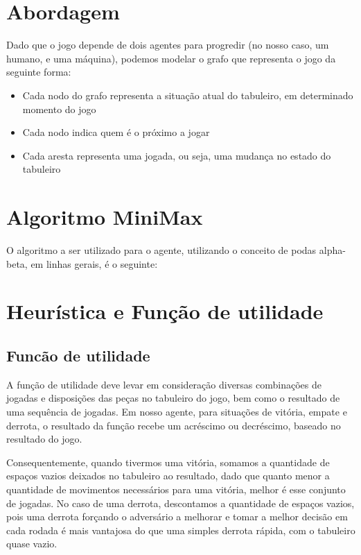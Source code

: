 \documentclass{article}
\begin{document}
  
  
  \section{Abordagem}
  Dado que o jogo depende de dois agentes para progredir (no nosso caso, um humano, e uma máquina), podemos modelar o
  grafo que representa o jogo da seguinte forma:
  
  \begin{itemize}
    \item Cada nodo do grafo representa a situação atual do tabuleiro, em determinado momento do jogo
    \item Cada nodo indica quem é o próximo a jogar
    \item Cada aresta representa uma jogada, ou seja, uma mudança no estado do tabuleiro
  \end{itemize}
  
  \section{Algoritmo MiniMax}
  O algoritmo a ser utilizado para o agente, utilizando o conceito de podas alpha-beta, em linhas gerais, é o seguinte:
  
  
  \section{Heurística e Função de utilidade}
    \subsection {Funcão de utilidade}
      A função de utilidade deve levar em consideração diversas combinações de jogadas e disposições das peças
      no tabuleiro do jogo, bem como o resultado de uma sequência de jogadas. Em nosso agente, para situações de
      vitória, empate e derrota, o resultado da função recebe um acréscimo ou decréscimo, baseado no resultado do jogo.
  
      Consequentemente, quando tivermos uma vitória, somamos a quantidade de espaços vazios deixados no tabuleiro ao
      resultado, dado que quanto menor a quantidade de movimentos necessários para uma vitória, melhor é esse conjunto
      de jogadas. No caso de uma derrota, descontamos a quantidade de espaços vazios, pois uma derrota forçando o
      adversário a melhorar e tomar a melhor decisão em cada rodada é mais vantajosa do que uma simples derrota
      rápida, com o tabuleiro quase vazio.
  
\end{document}
